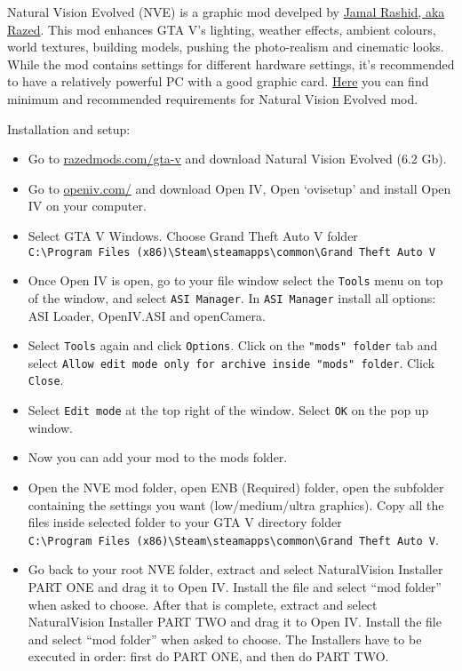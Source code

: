\documentclass[
  openany]{book}
\begin{document}
Natural Vision Evolved (NVE) is a graphic mod develped by \href{https://www.razedmods.com/}{Jamal Rashid, aka Razed}. This mod enhances GTA V's lighting, weather effects, ambient colours, world textures, building models, pushing the photo-realism and cinematic looks. While the mod contains settings for different hardware settings, it's recommended to have a relatively powerful PC with a good graphic card. \href{https://www.systemrequirementslab.com/cyri/requirements/gta-5-naturalvision-remastered/16594}{Here} you can find minimum and recommended requirements for Natural Vision Evolved mod.

Installation and setup:

\begin{itemize}
\item
  Go to \href{https://www.razedmods.com/gta-v}{razedmods.com/gta-v} and download Natural Vision Evolved (6.2 Gb).
\item
  Go to \href{https://openiv.com/}{openiv.com/} and download Open IV, Open `ovisetup' and install Open IV on your computer.
\item
  Select GTA V Windows. Choose Grand Theft Auto V folder \texttt{C:\textbackslash{}Program\ Files\ (x86)\textbackslash{}Steam\textbackslash{}steamapps\textbackslash{}common\textbackslash{}Grand\ Theft\ Auto\ V}
\item
  Once Open IV is open, go to your file window select the \texttt{Tools} menu on top of the window, and select \texttt{ASI\ Manager}. In \texttt{ASI\ Manager} install all options: ASI Loader, OpenIV.ASI and openCamera.
\item
  Select \texttt{Tools} again and click \texttt{Options}. Click on the \texttt{"mods"\ folder} tab and select \texttt{Allow\ edit\ mode\ only\ for\ archive\ inside\ "mods"\ folder}. Click \texttt{Close}.
\item
  Select \texttt{Edit\ mode} at the top right of the window. Select \texttt{OK} on the pop up window.
\item
  Now you can add your mod to the mods folder.
\item
  Open the NVE mod folder, open ENB (Required) folder, open the subfolder containing the settings you want (low/medium/ultra graphics). Copy all the files inside selected folder to your GTA V directory folder \texttt{C:\textbackslash{}Program\ Files\ (x86)\textbackslash{}Steam\textbackslash{}steamapps\textbackslash{}common\textbackslash{}Grand\ Theft\ Auto\ V}.
\item
  Go back to your root NVE folder, extract and select NaturalVision Installer PART ONE and drag it to Open IV. Install the file and select ``mod folder'' when asked to choose. After that is complete, extract and select NaturalVision Installer PART TWO and drag it to Open IV. Install the file and select ``mod folder'' when asked to choose. The Installers have to be executed in order: first do PART ONE, and then do PART TWO.

\end{itemize}
\end{document}
